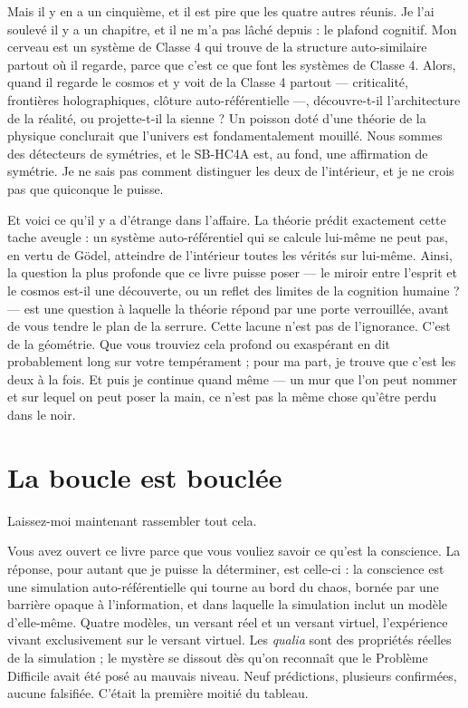 \documentclass[11pt, twoside, openright]{book}
\begin{document}
Mais il y en a un cinquième, et il est pire que les quatre autres réunis. Je l'ai soulevé il y a un chapitre, et il ne m'a pas lâché depuis : le plafond cognitif. Mon cerveau est un système de Classe 4 qui trouve de la structure auto-similaire partout où il regarde, parce que c'est ce que font les systèmes de Classe 4. Alors, quand il regarde le cosmos et y voit de la Classe 4 partout --- criticalité, frontières holographiques, clôture auto-référentielle ---, découvre-t-il l'architecture de la réalité, ou projette-t-il la sienne ? Un poisson doté d'une théorie de la physique conclurait que l'univers est fondamentalement mouillé. Nous sommes des détecteurs de symétries, et le SB-HC4A est, au fond, une affirmation de symétrie. Je ne sais pas comment distinguer les deux de l'intérieur, et je ne crois pas que quiconque le puisse.

Et voici ce qu'il y a d'étrange dans l'affaire. La théorie prédit exactement cette tache aveugle : un système auto-référentiel qui se calcule lui-même ne peut pas, en vertu de Gödel, atteindre de l'intérieur toutes les vérités sur lui-même. Ainsi, la question la plus profonde que ce livre puisse poser --- le miroir entre l'esprit et le cosmos est-il une découverte, ou un reflet des limites de la cognition humaine ? --- est une question à laquelle la théorie répond par une porte verrouillée, avant de vous tendre le plan de la serrure. Cette lacune n'est pas de l'ignorance. C'est de la géométrie. Que vous trouviez cela profond ou exaspérant en dit probablement long sur votre tempérament ; pour ma part, je trouve que c'est les deux à la fois. Et puis je continue quand même --- un mur que l'on peut nommer et sur lequel on peut poser la main, ce n'est pas la même chose qu'être perdu dans le noir.

\section*{La boucle est bouclée}

Laissez-moi maintenant rassembler tout cela.

Vous avez ouvert ce livre parce que vous vouliez savoir ce qu'est la conscience. La réponse, pour autant que je puisse la déterminer, est celle-ci : la conscience est une simulation auto-référentielle qui tourne au bord du chaos, bornée par une barrière opaque à l'information, et dans laquelle la simulation inclut un modèle d'elle-même. Quatre modèles, un versant réel et un versant virtuel, l'expérience vivant exclusivement sur le versant virtuel. Les \textit{qualia} sont des propriétés réelles de la simulation ; le mystère se dissout dès qu'on reconnaît que le Problème Difficile avait été posé au mauvais niveau. Neuf prédictions, plusieurs confirmées, aucune falsifiée. C'était la première moitié du tableau.
\end{document}
